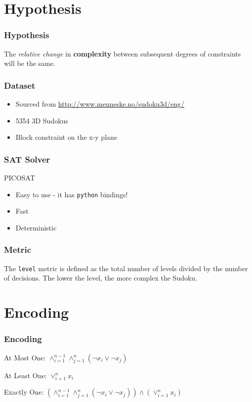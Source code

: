 \documentclass{beamer}
\begin{document}
\section{Hypothesis}

\begin{frame}
	\frametitle{Hypothesis}
	{\Large The \emph{relative change} in \textbf{complexity} between subsequent degrees of constraints will be the same. }	
\end{frame}


\begin{frame}
\frametitle{Dataset}

\begin{itemize}
	\item Sourced from \url{http://www.menneske.no/sudoku3d/eng/}
	\item 5354 3D Sudokus \pause
	\item Block constraint on the x-y plane 
\end{itemize}	
\end{frame}

\begin{frame}
\frametitle{SAT Solver}
{\Large PICOSAT} 
\begin{itemize}
\item Easy to use - it has \texttt{python} bindings! \pause
\item Fast \pause
\item Deterministic
\end{itemize}
\end{frame}

\begin{frame}
	\frametitle{Metric}
	{\Large The \texttt{level} metric is defined as the total number of levels divided by the number of decisions. The lower the level, the more complex the Sudoku.}
\end{frame}


\section{Encoding}  

\begin{frame}
\frametitle{Encoding}
	\begin{center}
		At Most One: $\land^{n-1}_{i=1}\land^{n}_{j=1}(\neg x_i \lor \neg x_j)$ \pause
	\end{center}
	\begin{center}
		At Least One: $\lor^{n}_{i=1}x_i$ \pause
	\end{center}
	\begin{center}
		Exactly One:  $\left(\land^{n-1}_{i=1}\land^{n}_{j=1}(\neg x_i \lor \neg x_j)\right) \land \left(\lor^{n}_{i=1}x_i\right)$
	\end{center}
\end{frame}
\end{document}
